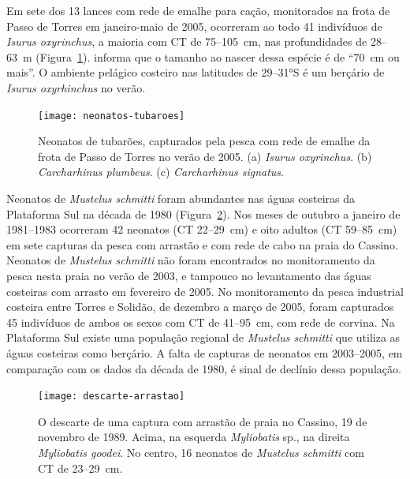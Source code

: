 \documentclass[a4paper,11pt,twoside,showtrims,onecolumn,openright,final]{memoir}
\begin{document}
Em sete dos 13 lances com rede de emalhe para cação, monitorados na frota de Passo de Torres 
em janeiro-maio de 2005, ocorreram ao todo 41 indivíduos  de \emph{Isurus oxyrinchus}, 
a maioria com CT de 75--105~cm, nas profundidades de 28--63~m (Figura~\ref{fig:elasmos-fig3}). 
\citet[p.19, tradução pelos autores]{branstetter1990} informa que o tamanho ao nascer dessa 
espécie é de ``70~cm ou mais''. O ambiente pelágico costeiro nas latitudes de 29--31°S 
é um berçário de \emph{Isurus oxyrhinchus} no verão.


%
%

\begin{figure}
\begin{center}
\texttt{[image: neonatos-tubaroes]}
\end{center}
\caption[Neonatos de tubarões capturados pela pesca com rede de emalhe]
	{Neonatos de tubarões, capturados pela pesca com rede de emalhe da frota 
         de Passo de Torres no verão de 2005.
         (a) \emph{Isurus oxyrinchus}.
         (b) \emph{Carcharhinus plumbeus}.
         (c) \emph{Carcharhinus signatus}.}
\label{fig:elasmos-fig3}
\end{figure}



Neonatos de \emph{Mustelus schmitti} foram abundantes nas águas costeiras da Plataforma Sul 
na década de 1980 (Figura~\ref{fig:elasmos-fig2}). %
Nos meses de outubro a janeiro de 1981--1983 ocorreram 42 neonatos (CT 22--29~cm) e 
oito adultos (CT 59--85~cm) em sete capturas da pesca com arrastão e com rede de cabo 
na praia do Cassino. Neonatos de \emph{Mustelus schmitti} não foram encontrados no monitoramento 
da pesca nesta praia no verão de 2003, e tampouco no  levantamento das águas costeiras com arrasto 
em fevereiro de 2005. No monitoramento da pesca industrial costeira entre Torres e Solidão, de dezembro 
a março de 2005, foram capturados 45 indivíduos de ambos os sexos com CT de 41--95~cm, com rede de corvina. 
Na Plataforma Sul existe uma população regional de \emph{Mustelus schmitti} que utiliza as águas costeiras 
como berçário. A falta de capturas de neonatos em 2003--2005, em comparação com os dados da década de 1980, 
é sinal de declínio dessa população.

%
%

\begin{figure}
\begin{center}
\texttt{[image: descarte-arrastao]}
\end{center}
\caption[Descarte de uma captura com arrastão de praia no Cassino]
	{O descarte de uma captura com arrastão de praia no Cassino, 19 de novembro de 1989. 
         Acima, na esquerda \emph{Myliobatis} sp., na direita \emph{Myliobatis goodei}. 
         No centro, 16 neonatos de \emph{Mustelus schmitti} com CT de 23--29~cm.}
\label{fig:elasmos-fig2}
\end{figure}
\end{document}
